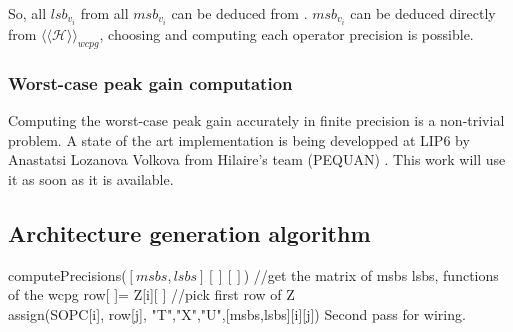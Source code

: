 		 So, all $lsb_{v_i}$ from all $msb_{v_i}$ can  be deduced from \label{constraint}.
		$msb_{v_i}$ can be deduced directly from $\langle\langle \mathcal{H} \rangle\rangle_{wcpg}$, choosing and computing each operator precision is possible.


		
		\subsubsection{Worst-case peak gain computation}
			Computing the worst-case peak gain accurately in finite precision is a non-trivial problem.
			A state of the art implementation is being developped at LIP6 by Anastatsi Lozanova Volkova from Hilaire's team (PEQUAN) \cite{Volk15a}.
			This work will use it as soon as it is available.


\subsection{Architecture generation algorithm}

	\begin{algorithm}[H]
	computePrecisions($[msbs,lsbs][][]$) //get the matrix of msbs lsbs, functions of the wcpg
	 {
	 	row[ ]= Z[i][ ] //pick first row of Z \\
	 	 {
	 		assign(SOPC[i], row[j], {"T","X","U"},[msbs,lsbs][i][j])
	 	}
		Second pass for wiring.
	}
	\end{algorithm}

